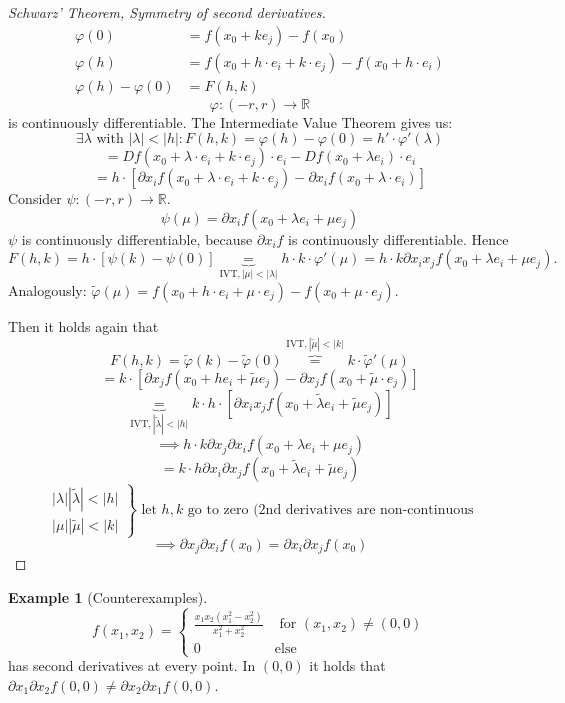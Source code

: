 \documentclass[a4paper,landscape,twocolumn]{article}
\theoremstyle{definition}
\newtheorem{ex}{Example}
\newcommand\abs[1]{\left|#1\right|}
\begin{document}
\begin{proof}[Schwarz' Theorem, Symmetry of second derivatives]
  \begin{align*}
    \varphi(0) &= f(x_0 + ke_j) - f(x_0) \\
    \varphi(h) &= f(x_0 + h\cdot e_i + k \cdot e_j) - f(x_0 + h \cdot e_i) \\
    \varphi(h) - \varphi(0) &= F(h,k)
  \end{align*}
  \[  \varphi: (-r, r) \to \mathbb R \]
  is continuously differentiable.
  The Intermediate Value Theorem gives us:
  \[ \exists \lambda \text{ with } \abs{\lambda} < \abs{h}: F(h,k) = \varphi(h) - \varphi(0) = h' \cdot \varphi'(\lambda) \]
  \[ = Df(x_0 + \lambda \cdot e_i + k \cdot e_j) \cdot e_i - Df(x_0 + \lambda e_i) \cdot e_i \]
  \[ = h \cdot \left[\partial x_i f(x_0 + \lambda \cdot e_i + k \cdot e_j) - \partial x_i f(x_0 + \lambda \cdot e_i)\right] \]
  Consider $\psi: (-r, r) \to \mathbb R$.
  \[ \psi(\mu) = \partial x_i f(x_0 + \lambda e_i + \mu e_j) \]
  $\psi$ is continuously differentiable, because $\partial x_i f$ is continuously differentiable.
  Hence
  \[
  F(h,k)
  = h \cdot [\psi(k) - \psi(0)]
  \underbrace{=}_{\text{IVT}, \abs{\mu} < \abs{\lambda}} h \cdot k \cdot \varphi'(\mu)
  = h \cdot k \partial x_i x_j f(x_0 + \lambda e_i + \mu e_j).
  \]
  Analogously: $\tilde{\varphi}(\mu) = f(x_0 + h \cdot e_i + \mu \cdot e_j) - f(x_0 + \mu \cdot e_j)$.

  Then it holds again that
  \[ F(h,k) = \tilde{\varphi}(k) - \tilde{\varphi}(0) \overbrace{=}^{\text{IVT}, \abs{\tilde{\mu}} < \abs{k}} k \cdot \tilde{\varphi}'(\mu) \]
  \[ = k \cdot \left[\partial x_j f(x_0 + he_i + \tilde{\mu} e_j) - \partial x_j f(x_0 + \tilde{\mu} \cdot e_j)\right] \]
  \[ \underbrace{=}_{\text{IVT}, \abs{\tilde{\lambda}} < \abs{h}} k \cdot h \cdot \left[\partial x_i x_j f(x_0 + \tilde{\lambda} e_i + \tilde{\mu} e_j)\right] \]
  \[ \implies h \cdot k \partial x_j \partial x_i f(x_0 + \lambda e_i + \mu e_j) \]
  \[ = k \cdot h \partial x_i \partial x_j f(x_0 + \tilde{\lambda} e_i + \tilde{\mu} e_j) \]
  \[
    \left.\begin{array}{c}
      \abs{\lambda} \abs{\tilde{\lambda}} < \abs{h} \\
      \abs{\mu} \abs{\tilde{\mu}} < \abs{k}
    \end{array}\right\}
    \text{ let $h, k$ go to zero (2nd derivatives are non-continuous}
  \]
  \[ \implies \partial x_j \partial x_i f(x_0) = \partial x_i \partial x_j f(x_0) \]
\end{proof}

\begin{ex}[Counterexamples]
  \[
  f(x_1, x_2) = \begin{cases}
    \frac{x_1 x_2 (x_1^2 - x_2^2)}{x_1^2 + x_2^2} & \text{ for } (x_1, x_2) \neq (0, 0) \\
    0 & \text{else}
  \end{cases}
  \]
  has second derivatives at every point. In $(0, 0)$ it holds that
  $\partial x_1 \partial x_2 f(0, 0) \neq \partial x_2 \partial x_1 f(0, 0)$.
\end{ex}
\end{document}
